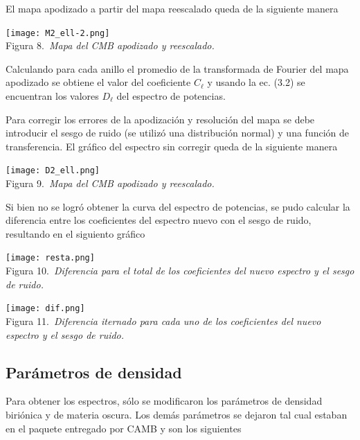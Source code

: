 \documentclass[twocolumn,letterpaper,spanish]{revtex4}
\numberwithin{equation}{section}
\begin{document}
El mapa apodizado a partir del mapa reescalado queda de la siguiente manera

\begin{center}
  \texttt{[image: M2\_ell-2.png]}\\
   Figura 8.\emph{\ Mapa del CMB apodizado y reescalado.}
\end{center}


Calculando para cada anillo el promedio de la transformada de Fourier del mapa apodizado se obtiene el valor del coeficiente $C_{\ell}$ y usando la ec. (3.2) se encuentran los valores $D_{\ell}$ del espectro de potencias.


Para corregir los errores de la apodizaci\'on y resoluci\'on del mapa se debe introducir el sesgo de ruido (se utiliz\'o una distribuci\'on normal) y una funci\'on de transferencia. El gr\'afico del espectro sin corregir queda de la siguiente manera 

\begin{center}
  \texttt{[image: D2\_ell.png]}\\
   Figura 9.\emph{\ Mapa del CMB apodizado y reescalado.}
\end{center}

Si bien no se logr\'o obtener la curva del espectro de potencias, se pudo calcular la diferencia entre los coeficientes del espectro nuevo con el sesgo de ruido, resultando en el siguiento gr\'afico

\begin{center}
   \texttt{[image: resta.png]}\\
   Figura 10.\emph{\ Diferencia para el total de los coeficientes del nuevo espectro y el sesgo de ruido.}
\end{center}


\begin{center}
   \texttt{[image: dif.png]}\\
   Figura 11.\emph{\ Diferencia iternado para cada uno de los coeficientes del nuevo espectro y el sesgo de ruido.}
\end{center}


\subsection{Par\'ametros de densidad}

Para obtener los espectros, s\'olo se modificaron los par\'ametros de densidad biri\'onica y de materia oscura. Los dem\'as par\'ametros se dejaron tal cual estaban en el paquete entregado por CAMB y son los siguientes 
\end{document}
